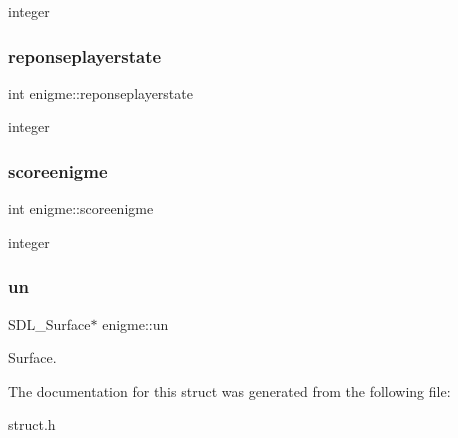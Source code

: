 integer \mbox{\label{structenigme_ab94caae0675568e58f44e338c4582046}} 
\subsubsection{\texorpdfstring{reponseplayerstate}{reponseplayerstate}}
{\footnotesize\ttfamily int enigme\+::reponseplayerstate}

integer \mbox{\label{structenigme_a5c3c1be5f426abd6512176b9f31b90e7}} 
\subsubsection{\texorpdfstring{scoreenigme}{scoreenigme}}
{\footnotesize\ttfamily int enigme\+::scoreenigme}

integer \mbox{\label{structenigme_adcbcd8ededa76b3b7fb1e8b80c4475ee}} 
\subsubsection{\texorpdfstring{un}{un}}
{\footnotesize\ttfamily S\+D\+L\+\_\+\+Surface$\ast$ enigme\+::un}

Surface. 

The documentation for this struct was generated from the following file\+:\begin{DoxyCompactItemize}
\item 
struct.\+h\end{DoxyCompactItemize}
